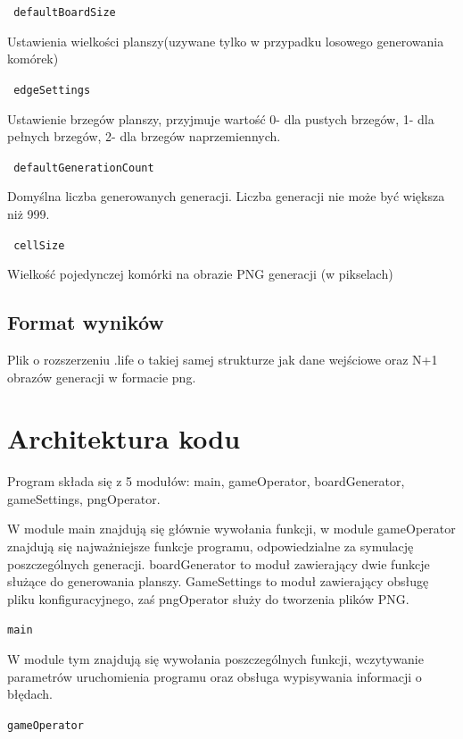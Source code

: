 \documentclass[a4paper,12pt,twoside]{article}
\newcommand{\prog}{\texttt}
\begin{document}
  \prog{ defaultBoardSize } 
  
  \hspace{1.5cm} Ustawienia wielkości planszy(uzywane tylko w przypadku losowego generowania komórek)  
  
  \prog{ edgeSettings } 
  
  \hspace{1.5cm} Ustawienie brzegów planszy, przyjmuje wartość 0- dla pustych brzegów, 1- dla pełnych brzegów, 2- dla brzegów naprzemiennych.
  
  \prog{ defaultGenerationCount } 
  
  \hspace{1.5cm}  Domyślna liczba generowanych generacji. Liczba generacji nie może być większa niż 999.
  
  \prog{ cellSize } 
  
  \hspace{1.5cm}  Wielkość pojedynczej komórki na obrazie PNG generacji (w pikselach)
   


\subsection{Format wyników}

   Plik o rozszerzeniu .life o takiej samej strukturze jak dane wejściowe oraz N+1 obrazów generacji w formacie png.



\section{Architektura kodu}
Program składa się z 5 modułów: main, gameOperator, boardGenerator, gameSettings, pngOperator.

  W module main znajdują się głównie wywołania funkcji, w module gameOperator znajdują się najważniejsze funkcje programu, odpowiedzialne za symulację poszczególnych generacji. boardGenerator to moduł zawierający dwie funkcje służące do generowania planszy. GameSettings to moduł zawierający obsługę pliku konfiguracyjnego, zaś pngOperator służy do tworzenia plików PNG.
  
   \prog{main} 
  
  \hspace{1.5cm}W module tym znajdują się wywołania poszczególnych funkcji, wczytywanie parametrów uruchomienia programu oraz obsługa wypisywania informacji o błędach.

  \prog{gameOperator} 
\end{document}
